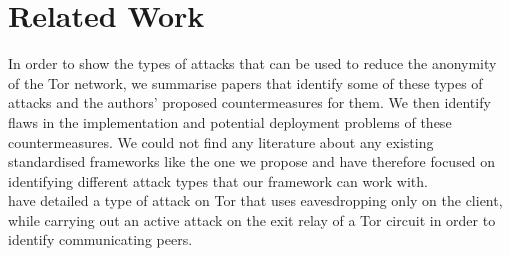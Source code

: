 \documentclass[9pt,technote]{IEEEtran}
\begin{document}
\cite{hayesguard}\cite{gilad2012spying}\cite{sun2015raptor}\cite{biryukov2012torscan}\cite{jansen2014sniper}\cite{tor}

\section{Related Work} In order to show the types of attacks that can be used to
reduce the anonymity of the Tor network, we summarise papers that identify some
of these types of attacks and the authors' proposed countermeasures for them. We
then identify flaws in the implementation and potential deployment problems of
these countermeasures. We could not find any literature about any existing
standardised frameworks like the one we propose and have therefore focused on
identifying different attack types that our framework can work with.\\

\citeauthor{gilad2012spying} have detailed a type of attack on Tor that uses
eavesdropping only on the client, while carrying out an active attack on the
exit relay of a Tor circuit in order to identify communicating peers.


 

\end{document}
